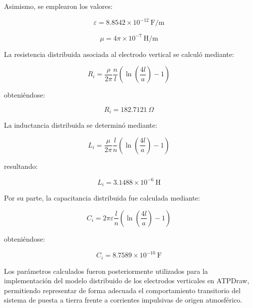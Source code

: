 \documentclass[12pt,letterpaper]{article}
\begin{document}
Asimismo, se emplearon los valores:

\begin{equation*}
\varepsilon=8.8542\times10^{-12}\ \mathrm{F/m}
\end{equation*}

\begin{equation*}
\mu=4\pi\times10^{-7}\ \mathrm{H/m}
\end{equation*}

La resistencia distribuida asociada al electrodo vertical se calculó mediante:

\begin{equation}
R_i=
\frac{\rho}{2\pi}
\frac{n}{l}
\left(
\ln
\left(
\frac{4l}{a}
\right)
-1
\right)
\label{eq:r_varilla}
\end{equation}

obteniéndose:

\begin{equation*}
R_i=182.7121\ \Omega
\end{equation*}

La inductancia distribuida se determinó mediante:

\begin{equation}
L_i=
\frac{\mu}{2\pi}
\frac{l}{n}
\left(
\ln
\left(
\frac{4l}{a}
\right)
-1
\right)
\label{eq:l_varilla}
\end{equation}

resultando:

\begin{equation*}
L_i=3.1488\times10^{-6}\ \mathrm{H}
\end{equation*}

Por su parte, la capacitancia distribuida fue calculada mediante:

\begin{equation}
C_i=
2\pi\varepsilon
\frac{l}{n}
\left(
\ln
\left(
\frac{4l}{a}
\right)
-1
\right)
\label{eq:c_varilla}
\end{equation}

obteniéndose:

\begin{equation*}
C_i=8.7589\times10^{-10}\ \mathrm{F}
\end{equation*}

Los parámetros calculados fueron posteriormente utilizados para la implementación del modelo distribuido de los electrodos verticales en ATPDraw, permitiendo representar de forma adecuada el comportamiento transitorio del sistema de puesta a tierra frente a corrientes impulsivas de origen atmosférico.
\end{document}
